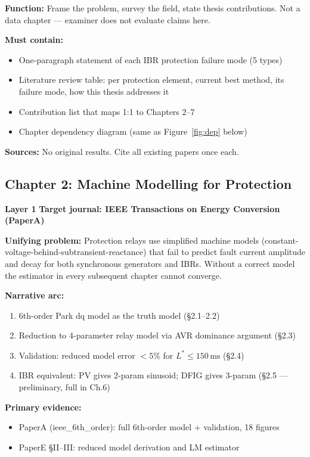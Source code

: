 \documentclass[11pt, a4paper]{article}
\newcommand{\chtag}[2]{\colorbox{#1}{\color{white}\textbf{\small #2}}}
\begin{document}
\textbf{Function:} Frame the problem, survey the field, state thesis contributions.
Not a data chapter — examiner does not evaluate claims here.

\textbf{Must contain:}
\begin{itemize}[nosep]
  \item One-paragraph statement of each IBR protection failure mode (5 types)
  \item Literature review table: per protection element, current best method, its failure mode, how this thesis addresses it
  \item Contribution list that maps 1:1 to Chapters 2--7
  \item Chapter dependency diagram (same as Figure~\ref{fig:dep} below)
\end{itemize}

\textbf{Sources:} No original results. Cite all existing papers once each.

\subsection{Chapter 2: Machine Modelling for Protection}

\chtag{C1col}{Layer 1} \quad \textbf{Target journal: IEEE Transactions on Energy Conversion (PaperA)}

\textbf{Unifying problem:} Protection relays use simplified machine models
(constant-voltage-behind-subtransient-reactance) that fail to predict fault
current amplitude and decay for both synchronous generators and IBRs.  Without
a correct model the estimator in every subsequent chapter cannot converge.

\textbf{Narrative arc:}
\begin{enumerate}[nosep]
  \item 6th-order Park dq model as the truth model (§2.1--2.2)
  \item Reduction to 4-parameter relay model via AVR dominance argument (§2.3)
  \item Validation: reduced model error $< 5\%$ for $L^* \leq 150\,\text{ms}$ (§2.4)
  \item IBR equivalent: PV gives 2-param sinusoid; DFIG gives 3-param (§2.5 — preliminary, full in Ch.6)
\end{enumerate}

\textbf{Primary evidence:}
\begin{itemize}[nosep]
  \item PaperA (ieee\_6th\_order): full 6th-order model + validation, 18 figures
  \item PaperE §II--III: reduced model derivation and LM estimator
\end{itemize}
\end{document}
